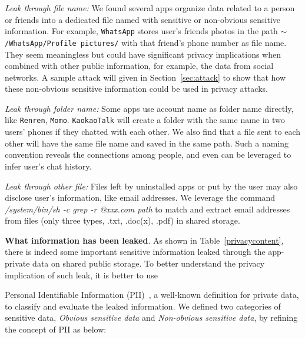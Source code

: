\documentclass{sig-alternate}
\begin{document}
\vspace{2pt}\noindent \textit{Leak through file name:} We found several apps organize data related to a person or friends into a dedicated file named with sensitive or non-obvious sensitive information. For example, \texttt{WhatsApp} stores user's friends photos in the path \texttt{$\sim$/WhatsApp/Profile pictures/} with that friend's phone number as file name. They seem meaningless but could have significant privacy implications when combined with other public information, for example, the data from social networks. A sample attack will given in Section~\ref{sec:attack} to show that how these non-obvious sensitive information could be used in privacy attacks.


\vspace{2pt}\noindent \textit{Leak through folder name:} Some apps use account name as folder name directly, like \texttt{Renren}, \texttt{Momo}. \texttt{KaokaoTalk} will create a folder with the same name in two users' phones if they chatted with each other. We also find that a file sent to each other will have the same file name and saved in the same path. Such a naming convention reveals the connections among people, and even can be leveraged to infer user's chat history.

\vspace{2pt}\noindent \textit{Leak through other file:} Files left by uninstalled apps or put by the user may also disclose user's information, like email addresses. We leverage the command \textit{/system/bin/sh -c grep -r @xxx.com path} to match and extract email addresses from files (only three types, .txt, .doc(x), .pdf) in shared storage.



\begin{figure}[tb]
\end{figure}




\vspace{8pt}
\noindent\textbf{What information has been leaked}. As shown in Table~\ref{privacycontent}, there is indeed some important sensitive information leaked through the app-private data on shared public storage. To better understand the privacy implication of such leak, it is better to use

Personal Identifiable Information (PII)~\cite{mccallister2010guide}, a well-known definition for private data, to classify and evaluate the leaked information. We defined two categories of sensitive data, \textit{Obvious sensitive data} and \textit{Non-obvious sensitive data}, by refining the concept of PII as below:
\end{document}
